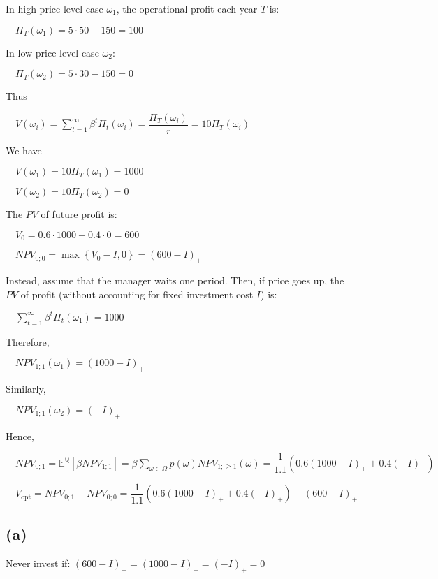 \documentclass{article}
\begin{document}
In high price level case $\omega_{1}$, the operational profit each year $T$ is:

$\quad \Pi_{T}\left(\omega_{1}\right)=5\cdot50-150=100$

In low price level case $\omega_{2}$:

$\quad \Pi_{T}\left(\omega_{2}\right)=5\cdot30-150=0$

Thus

$\quad \displaystyle V\left(\omega_{i}\right)=\sum^{\infty}_{t=1}\beta^{t}\Pi_{t}\left(\omega_{i}\right)=\dfrac{\Pi_{T}\left(\omega_{i}\right)}{r}=10\Pi_{T}\left(\omega_{i}\right)$

We have

$\quad V\left(\omega_{1}\right)=10\Pi_{T}\left(\omega_{1}\right)=1000$

$\quad V\left(\omega_{2}\right)=10\Pi_{T}\left(\omega_{2}\right)=0$

The $PV$ of future profit is:

$\quad V_{0}=0.6\cdot1000+0.4\cdot0=600$

$\quad NPV_{0;0}=\max\left\{V_{0}-I, 0\right\}=\left(600-I\right)_{+}$

Instead, assume that the manager waits one period. Then, if price goes up, the $PV$ of profit (without accounting for fixed investment cost $I$) is:

$\quad \displaystyle \sum^{\infty}_{t=1}\beta^{t}\Pi_{t}\left(\omega_{1}\right)=1000$

Therefore,

$\quad NPV_{1;1}\left(\omega_{1}\right)=\left(1000-I\right)_{+}$

Similarly,

$\quad NPV_{1;1}\left(\omega_{2}\right)=\left(-I\right)_{+}$

Hence,

$\quad\displaystyle NPV_{0;1}=\mathbb{E} ^{\mathbb{Q} }\left[\beta NPV_{1;1}\right]=\beta\sum_{\omega\in\Omega}p\left(\omega\right)NPV_{1;\geqslant1}\left(\omega\right)=\dfrac{1}{1.1}\left(0.6\left(1000-I\right)_{+}+0.4\left(-I\right)_{+}\right)$

$\quad V_{\text{opt}}=NPV_{0;1}-NPV_{0;0}=\dfrac{1}{1.1}\left(0.6\left(1000-I\right)_{+}+0.4\left(-I\right)_{+}\right)-\left(600-I\right)_{+}$

\subsection*{(a)}

Never invest if: $\left(600-I\right)_{+}=\left(1000-I\right)_{+}=\left(-I\right)_{+}=0$
\end{document}
